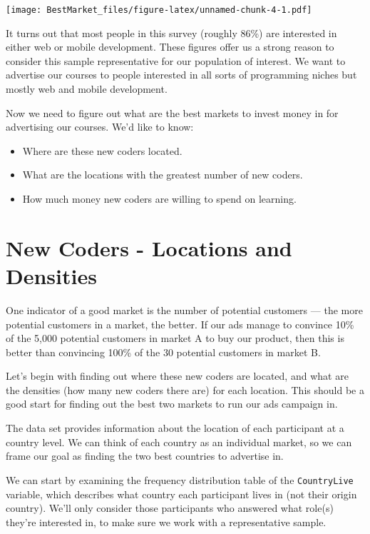 \documentclass[
]{article}
\providecommand{\tightlist}{%
  \setlength{\itemsep}{0pt}\setlength{\parskip}{0pt}}
\begin{document}
\texttt{[image: BestMarket\_files/figure-latex/unnamed-chunk-4-1.pdf]}

It turns out that most people in this survey (roughly 86\%) are
interested in either web or mobile development. These figures offer us a
strong reason to consider this sample representative for our population
of interest. We want to advertise our courses to people interested in
all sorts of programming niches but mostly web and mobile development.

Now we need to figure out what are the best markets to invest money in
for advertising our courses. We'd like to know:

\begin{itemize}
\tightlist
\item
  Where are these new coders located.
\item
  What are the locations with the greatest number of new coders.
\item
  How much money new coders are willing to spend on learning.
\end{itemize}

\hypertarget{new-coders---locations-and-densities}{%
\section{New Coders - Locations and
Densities}\label{new-coders---locations-and-densities}}

One indicator of a good market is the number of potential customers ---
the more potential customers in a market, the better. If our ads manage
to convince 10\% of the 5,000 potential customers in market A to buy our
product, then this is better than convincing 100\% of the 30 potential
customers in market B.

Let's begin with finding out where these new coders are located, and
what are the densities (how many new coders there are) for each
location. This should be a good start for finding out the best two
markets to run our ads campaign in.

The data set provides information about the location of each participant
at a country level. We can think of each country as an individual
market, so we can frame our goal as finding the two best countries to
advertise in.

We can start by examining the frequency distribution table of the
\texttt{CountryLive} variable, which describes what country each
participant lives in (not their origin country). We'll only consider
those participants who answered what role(s) they're interested in, to
make sure we work with a representative sample.
\end{document}
